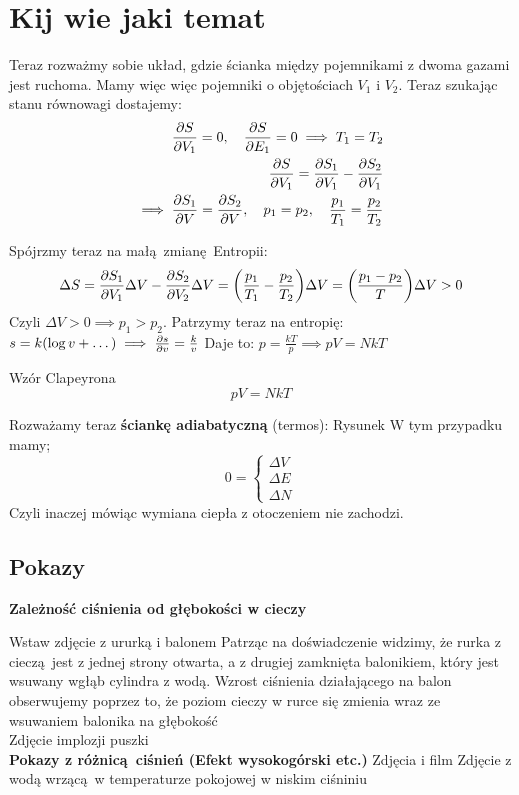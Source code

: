 \documentclass[12pt,a4paper]{report}
\newcommand{\com}[1]{{\color{red} #1}}
\renewcommand{\emph}{\textbf}
\newenvironment{lecture}[1]{\par\medskip
   \noindent\chapter{#1} \rmfamily}{\medskip}
\newenvironment{emph_box}[1]
    {\begin{center}
    \begin{tabular}{|p{0.9\textwidth}|}
    \hline
    \begin{center} \textbf{#1} \end{center}\\[1ex]
    }
    { 
    \\\\\hline
    \end{tabular} 
    \end{center}
    }
\begin{document}
\begin{lecture}{Kij wie jaki temat}
Teraz rozważmy sobie układ, gdzie ścianka między pojemnikami z dwoma gazami jest ruchoma. Mamy więc więc pojemniki o objętościach $V_1$ i $V_2$. Teraz szukając stanu równowagi dostajemy:
\begin{align*}
    \pdv{S}{V_1} = 0 \qc \pdv{S}{E_1} = 0 \implies T_1 = T_2\\
    \pdv{S}{V_1} = \pdv{S_1}{V_1} - \pdv{S_2}{V_1}\\
    \implies \pdv{S_1}{V} = \pdv{S_2}{V}\qc p_1 = p_2 \qc \frac{p_1}{T_1} = \frac{p_2}{T_2}
\end{align*}

Spójrzmy teraz na małą zmianę Entropii:
\[
    \Delta S = \pdv{S_1}{V_1} \Delta V - \pdv{S_2}{V_2} \Delta V = \qty(\frac{p_1}{T_1} - \frac{p_2}{T_2}) \Delta V = \qty(\frac{p_1 - p_2}{T})\Delta V > 0
\]
Czyli $\Delta V > 0 \implies p_1 > p_2$. Patrzymy teraz na entropię:
\(
    s = k (\log v + \dots) \implies \pdv{s}{v} = \frac{k}{v}
\) Daje to: \( p = \frac{kT}{p} \implies pV = NkT \)
\begin{emph_box}{Wzór Clapeyrona}
    \[
        pV = NkT
    \]
\end{emph_box}

Rozważamy teraz \emph{ściankę adiabatyczną} (termos):
\com{Rysunek}
W tym przypadku mamy;
\[ 0 = 
  \begin{cases}
      \Delta V\\
      \Delta E\\
      \Delta N
  \end{cases}
\]
Czyli inaczej mówiąc wymiana ciepła z otoczeniem nie zachodzi.

\section{Pokazy}
\emph{Zależność ciśnienia od głębokości w cieczy}

\com{Wstaw zdjęcie z ururką i balonem}
Patrząc na doświadczenie widzimy, że rurka z cieczą jest z jednej strony otwarta, a z drugiej zamknięta balonikiem, który jest wsuwany wgłąb cylindra z wodą. Wzrost ciśnienia działającego na balon obserwujemy poprzez to, że poziom cieczy w rurce się zmienia wraz ze wsuwaniem balonika na głębokość\\
\com{Zdjęcie implozji puszki}\\

\emph{Pokazy z różnicą ciśnień (Efekt wysokogórski etc.)} \com{Zdjęcia i film} \com{Zdjęcie z wodą wrzącą w temperaturze pokojowej w niskim ciśniniu}\\


\end{lecture}
\end{document}
